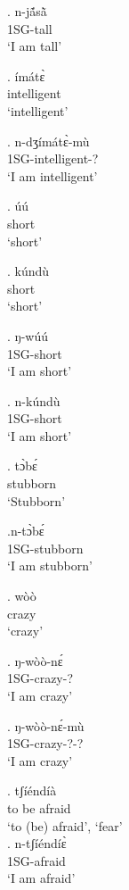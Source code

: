\documentclass{assets/fieldnotes}
\begin{document}
\exg. n-jã́sã̀\\
1SG-tall\\
`I am tall'

\exg. ímátɛ̀\\
intelligent\\
`intelligent'

\exg. n-dʒímátɛ̀-mù\\
1SG-intelligent-?\\
`I am intelligent'


\exg. úú\\
short\\
`short'

\exg. kúndù\\
short\\
`short'

\exg. ŋ-wúú\\
1SG-short\\
`I am short'

\exg. n-kúndù\\
1SG-short\\
`I am short'

\exg. tɔ̀bɛ́\\
stubborn\\
`Stubborn'

\ex.n-tɔ̀bɛ́\\
1SG-stubborn\\
`I am stubborn'

\exg. wòò\\
crazy\\
`crazy'

\exg. ŋ-wòò-nɛ́\\
1SG-crazy-?\\
`I am crazy'

\exg. ŋ-wòò-nɛ́-mù\\
1SG-crazy-?-?\\
`I am crazy'


\exg. tʃíéndíà\\
to be afraid\\
`to (be) afraid’, `fear’\\

\exg. n-tʃíéndíɛ̀\\
1SG-afraid\\
`I am afraid'
\end{document}
